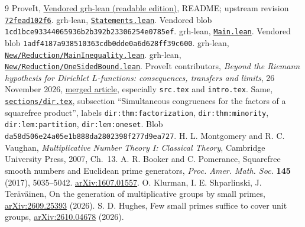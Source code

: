 \documentclass[11pt]{article}
\theoremstyle{remark}\newtheorem{remark}[theorem]{Remark}
\begin{document}
\begin{thebibliography}{9}\small
{} ProveIt, \href{https://github.com/VladimirReshetnikov/ProveIt/tree/main/Analysis/GeneralizedRiemannHypothesis/vendor/grh-lean}{Vendored grh-lean (readable edition)}, README; upstream revision \href{https://github.com/lsernau/grh-lean/tree/72fead102f663d5c7a407964a13dc0cf9d977207}{\texttt{72fead102f6}}.
 grh-lean, \href{https://github.com/lsernau/grh-lean/blob/72fead102f663d5c7a407964a13dc0cf9d977207/grh/src/Statements.lean}{\texttt{Statements.lean}}. Vendored blob \texttt{1cd1bce93344065936b2b392b23306254e0785ef}.
 grh-lean, \href{https://github.com/lsernau/grh-lean/blob/72fead102f663d5c7a407964a13dc0cf9d977207/grh/src/Main.lean}{\texttt{Main.lean}}. Vendored blob \texttt{1adf4187a938510363cdb0dde0a6d628ff39c600}.
 grh-lean, \href{https://github.com/lsernau/grh-lean/blob/72fead102f663d5c7a407964a13dc0cf9d977207/grh/src/New/Reduction/MainInequality.lean}{\texttt{New/Reduction/MainInequality.lean}}.
 grh-lean, \href{https://github.com/lsernau/grh-lean/blob/72fead102f663d5c7a407964a13dc0cf9d977207/grh/src/New/Reduction/OneSidedBound.lean}{\texttt{New/Reduction/OneSidedBound.lean}}.
 ProveIt contributors, \emph{Beyond the Riemann hypothesis for Dirichlet $L$-functions: consequences, transfers and limits}, 26 November 2026, \href{https://github.com/VladimirReshetnikov/ProveIt/tree/main/Analysis/GeneralizedRiemannHypothesis/Article}{merged article}, especially \texttt{src.tex} and \texttt{intro.tex}.
 Same, \href{https://github.com/VladimirReshetnikov/ProveIt/blob/main/Analysis/GeneralizedRiemannHypothesis/Article/sections/dir.tex}{\texttt{sections/dir.tex}}, subsection ``Simultaneous congruences for the factors of a squarefree product'', labels \texttt{dir:thm:factorization}, \texttt{dir:thm:minority}, \texttt{dir:lem:partition}, \texttt{dir:lem:oneset}. Blob \texttt{da58d506e24a05e1b888da2802398f277d9ea727}.
 H. L. Montgomery and R. C. Vaughan, \emph{Multiplicative Number Theory I: Classical Theory}, Cambridge University Press, 2007, Ch.~13.
 A. R. Booker and C. Pomerance, Squarefree smooth numbers and Euclidean prime generators, \emph{Proc. Amer. Math. Soc.} \textbf{145} (2017), 5035--5042. \href{https://arxiv.org/abs/1607.01557}{arXiv:1607.01557}.
 O. Klurman, I. E. Shparlinski, J. Ter\"av\"ainen, On the generation of multiplicative groups by small primes, \href{https://arxiv.org/abs/2609.25393}{arXiv:2609.25393} (2026).
 S. D. Hughes, Few small primes suffice to cover unit groups, \href{https://arxiv.org/abs/2610.04678}{arXiv:2610.04678} (2026).
\end{thebibliography}
\end{document}
